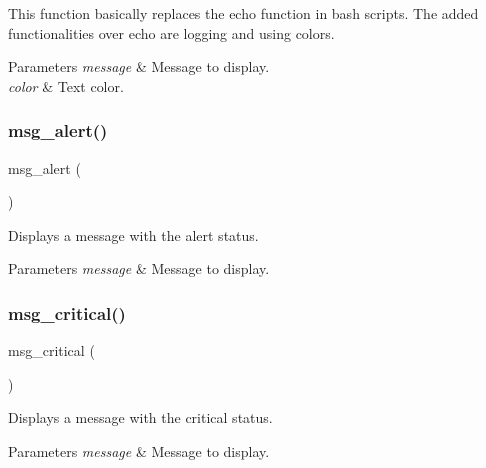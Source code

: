 This function basically replaces the \textquotesingle{}echo\textquotesingle{} function in bash scripts. The added functionalities over \textquotesingle{}echo\textquotesingle{} are logging and using colors. 
\begin{DoxyParams}{Parameters}
{\em message} & Message to display. \\
\hline
{\em color} & Text color. \\
\hline
\end{DoxyParams}
\mbox{\label{group__message_ga0b542f8978d859a6f0bd30de6791df41}} 
\subsubsection{\texorpdfstring{msg\+\_\+alert()}{msg\_alert()}}
{\footnotesize\ttfamily msg\+\_\+alert (\begin{DoxyParamCaption}\item[{message}]{ }\end{DoxyParamCaption})}



Displays a message with the \textquotesingle{}alert\textquotesingle{} status. 


\begin{DoxyParams}{Parameters}
{\em message} & Message to display. \\
\hline
\end{DoxyParams}
\mbox{\label{group__message_ga4f7002e0dcd96055ba404a5dd0ad34b1}} 
\subsubsection{\texorpdfstring{msg\+\_\+critical()}{msg\_critical()}}
{\footnotesize\ttfamily msg\+\_\+critical (\begin{DoxyParamCaption}\item[{message}]{ }\end{DoxyParamCaption})}



Displays a message with the \textquotesingle{}critical\textquotesingle{} status. 


\begin{DoxyParams}{Parameters}
{\em message} & Message to display. \\
\hline
\end{DoxyParams}
\mbox{\label{group__message_ga6a2070c37510d23ac294b0c007dde078}} 
